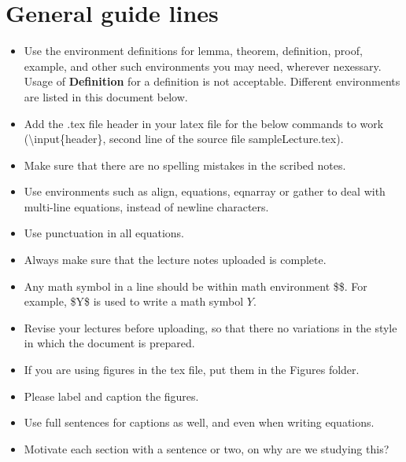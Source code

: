 \documentclass[a4paper,english,12pt]{article}
\begin{document}
\section{General guide lines}
\begin{itemize}
\item Use the environment definitions for lemma, theorem, definition, proof, example, and other such environments you may need, wherever nexessary. Usage of {\bf Definition} for a definition is not acceptable. Different environments are listed in this document below.
\item Add the .tex file header in your latex file for the below commands to work (\textbackslash input\{header\}, second line of the source file sampleLecture.tex).
\item Make sure that there are no spelling mistakes in the scribed notes.
\item Use environments such as align, equations, eqnarray or gather to deal with multi-line equations, instead of newline characters. 
\item Use punctuation in all equations.
\item Always make sure that the lecture notes uploaded is complete.
\item Any math symbol in a line should be within math environment \$\$. For example, \$Y\$ is used to write a math symbol $Y$.
\item Revise your lectures before uploading, so that there no variations in the style in which the document is prepared.
\item If you are using figures in the tex file, put them in the Figures folder.
\item Please label and caption the figures.
\item Use full sentences for captions as well, and even when writing equations.
\item Motivate each section with a sentence or two, on why are we studying this?
\end{itemize}
\end{document}
